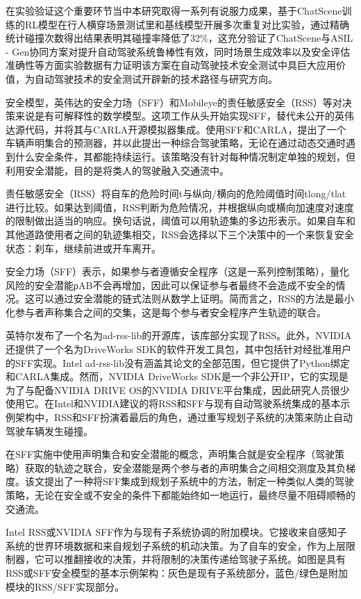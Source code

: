 在实验验证这个重要环节当中本研究取得一系列有说服力成果，基于ChatScene训练的RL模型在行人横穿场景测试里和基线模型开展多次重复对比实验，通过精确统计碰撞次数得出结果表明其碰撞率降低了32\%，这充分验证了ChatScene与ASIL - Gen协同方案对提升自动驾驶系统鲁棒性有效，同时场景生成效率以及安全评估准确性等方面实验数据有力证明该方案在自动驾驶技术安全测试中具巨大应用价值，为自动驾驶技术的安全测试开辟新的技术路径与研究方向。

安全模型，英伟达的安全力场（SFF）和Mobileye的责任敏感安全（RSS）等对决策来说是有可解释性的数学模型。这项工作从头开始实现SFF，替代未公开的英伟达源代码，并将其与CARLA开源模拟器集成。使用SFF和CARLA，提出了一个车辆声明集合的预测器，并以此提出一种综合驾驶策略，无论在通过动态交通时遇到什么安全条件，其都能持续运行。该策略没有针对每种情况制定单独的规划，但利用安全潜能，目的是将类人的驾驶融入交通流中。



责任敏感安全（RSS）将自车的危险时间t与纵向/横向的危险阈值时间tlong/tlat进行比较。如果达到阈值，RSS判断为危险情况，并根据纵向或横向加速度对速度的限制做出适当的响应。换句话说，阈值可以用轨迹集的多边形表示。如果自车和其他道路使用者之间的轨迹集相交，RSS会选择以下三个决策中的一个来恢复安全状态：刹车，继续前进或开车离开。

安全力场（SFF）表示，如果参与者遵循安全程序（这是一系列控制策略），量化风险的安全潜能ρAB不会再增加，因此可以保证参与者最终不会造成不安全的情况。这可以通过安全潜能的链式法则从数学上证明。简而言之，RSS的方法是最小化参与者声称集合之间的交集，这是每个参与者安全程序产生轨迹的联合。

英特尔发布了一个名为ad-rss-lib的开源库，该库部分实现了RSS。此外，NVIDIA还提供了一个名为DriveWorks SDK的软件开发工具包，其中包括针对经批准用户的SFF实现。Intel ad-rss-lib没有涵盖其论文的全部范围，但它提供了Python绑定和CARLA集成。然而，NVIDIA DriveWorks SDK是一个非公开IP，它的实现是为了与配备NVIDIA DRIVE OS的NVIDIA DRIVE平台集成，因此研究人员很少使用它。在Intel和NVIDIA建议的将RSS和SFF与现有自动驾驶系统集成的基本示例架构中，RSS和SFF扮演着最后的角色，通过重写规划子系统的决策来防止自动驾驶车辆发生碰撞。

在SFF实施中使用声明集合和安全潜能的概念，声明集合就是安全程序（驾驶策略）获取的轨迹之联合，安全潜能是两个参与者的声明集合之间相交测度及其负梯度。该文提出了一种将SFF集成到规划子系统中的方法，制定一种类似人类的驾驶策略，无论在安全或不安全的条件下都能始终如一地运行，最终尽量不阻碍顺畅的交通流。

Intel RSS或NVIDIA SFF作为与现有子系统协调的附加模块。它接收来自感知子系统的世界环境数据和来自规划子系统的机动决策。为了自车的安全，作为上层限制器，它可以推翻接收的决策，并将限制的决策传递给驾驶子系统。如图是具有RSS或SFF安全模型的基本示例架构：灰色是现有子系统部分，蓝色/绿色是附加模块的RSS/SFF实现部分\cite{陈华0面向智能辅助驾驶系统的驾驶员行为分析与建模}。

